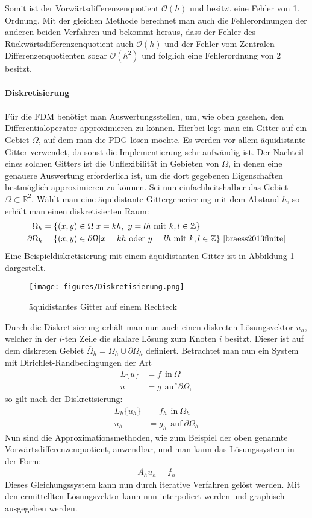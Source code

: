 \documentclass[a4paper,11pt]{article}
\begin{document}
Somit ist der Vorwärtsdifferenzenquotient $\mathcal{O}(h)$ und besitzt eine Fehler von 1. Ordnung. Mit der gleichen Methode berechnet man auch die Fehlerordnungen der anderen beiden Verfahren und bekommt heraus, dass der Fehler des Rückwärtsdifferenzenquotient auch $\mathcal{O}(h)$ und der Fehler vom Zentralen-Differenzenquotienten sogar $\mathcal{O}(h^2)$ und folglich eine Fehlerordnung von 2 besitzt.\\\\
\textbf{Diskretisierung}\\\\
Für die FDM benötigt man Auswertungsstellen, um, wie oben gesehen, den Differentialoperator approximieren zu können. Hierbei legt man ein Gitter auf ein Gebiet $\Omega$, auf dem man die PDG lösen möchte. Es werden vor allem äquidistante Gitter verwendet, da sonst die Implementierung sehr aufwändig ist. Der Nachteil eines solchen Gitters ist die Unflexibilität in Gebieten von $\Omega$, in denen eine genauere Auswertung erforderlich ist, um die dort gegebenen Eigenschaften bestmöglich approximieren zu können. Sei nun einfachheitshalber das Gebiet $\Omega\subset\mathbb{R}^2$. Wählt man eine äquidistante Gittergenerierung mit dem Abstand $h$, so erhält man einen diskretisierten Raum:
\begin{align}
 \Omega_h&=\{(x,y)\in\Omega|x=kh,~y=lh~\text{mit}~k,l\in\mathbb{Z}\}\nonumber\\
 \partial\Omega_h&=\{(x,y)\in\partial\Omega|x=kh~\text{oder}~y=lh~\text{mit}~k,l\in\mathbb{Z}\}\nonumber~\cite{braess2013finite}
\end{align}
Eine Beispieldiskretisierung mit einem äquidistanten Gitter ist in Abbildung \ref{fig:diskGit} dargestellt.
\begin{figure}[ht]
	\centering
	\texttt{[image: figures/Diskretisierung.png]}
	\caption[Diskretiesierung]{äquidistantes Gitter auf einem Rechteck}
	\label{fig:diskGit}
\end{figure}
Durch die Diskretisierung erhält man nun auch einen diskreten Lösungsvektor $u_h$, welcher in der $i$-ten Zeile die skalare Lösung zum Knoten $i$ besitzt. Dieser ist auf dem diskreten Gebiet $\overline{\Omega}_h=\Omega_h\cup\partial\Omega_h$ definiert. Betrachtet man nun ein System mit Dirichlet-Randbedingungen der Art
\begin{align}
 L\{u\}&=f~~\text{in}~\Omega\nonumber\\
 u&=g~~\text{auf}~\partial\Omega\nonumber,
\end{align}
so gilt nach der Diskretisierung:
\begin{align}
 L_h\{u_h\}&=f_h~~\text{in}~\Omega_h\nonumber\\
 u_h&=g_h~~\text{auf}~\partial\Omega_h\nonumber
\end{align}
Nun sind die Approximationsmethoden, wie zum Beispiel der oben genannte Vorwärtsdifferenzenquotient, anwendbar, und man kann das Lösungssystem in der Form:
\begin{align}
 A_hu_h=f_h
\end{align}
Dieses Gleichungssystem kann nun durch iterative Verfahren gelöst werden. Mit den ermittellten Lösungsvektor kann nun interpoliert werden und graphisch ausgegeben werden.
\end{document}
